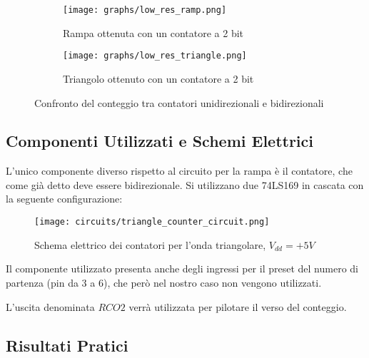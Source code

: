 \begin{figure}[ht]
    \centering

    \begin{subfigure}{.5\textwidth}
        \centering
        \texttt{[image: graphs/low\_res\_ramp.png]}
        \caption{Rampa ottenuta con un contatore a 2 bit}
    \end{subfigure}%
    \begin{subfigure}{.5\textwidth}
        \centering
        \texttt{[image: graphs/low\_res\_triangle.png]}
        \caption{Triangolo ottenuto con un contatore a 2 bit}
    \end{subfigure}

    \caption{Confronto del conteggio tra contatori unidirezionali e bidirezionali}
    \label{steps}
\end{figure}


\subsection*{Componenti Utilizzati e Schemi Elettrici}


L'unico componente diverso rispetto al circuito per la rampa è il contatore, che come già
detto deve essere bidirezionale. Si utilizzano due 74LS169 \cite{74ls169} in cascata con
la seguente configurazione:
\medskip

\begin{figure}[ht]
    \centering
    \texttt{[image: circuits/triangle\_counter\_circuit.png]}
    \caption{Schema elettrico dei contatori per l'onda triangolare, $V_{dd}=+5V$}
    \label{triangle_counter_circuit}
\end{figure}

Il componente utilizzato presenta anche degli ingressi per il preset del numero di partenza
(pin da 3 a 6), che però nel nostro caso non vengono utilizzati.

L'uscita denominata $RCO2$ verrà utilizzata per pilotare il verso del conteggio.


\subsection*{Risultati Pratici}

